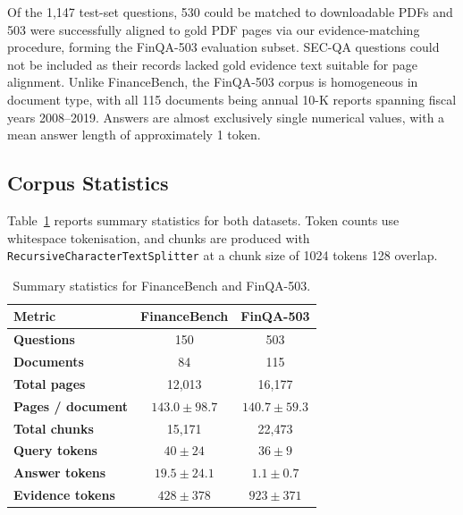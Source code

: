 \documentclass[12pt,twoside,maitrise]{dms}
\theoremstyle{definition}
\numberwithin{equation}{section}
\numberwithin{table}{chapter}
\numberwithin{figure}{chapter}
\begin{document}
Of the 1,147 test-set questions, 530 could be matched to downloadable PDFs and 503
were successfully aligned to gold PDF pages via our evidence-matching procedure,
forming the FinQA-503 evaluation subset. SEC-QA questions could not be
included as their records lacked gold evidence text suitable for page alignment.
Unlike FinanceBench, the FinQA-503 corpus is homogeneous in document type, with all
115 documents being annual 10-K reports spanning fiscal years 2008--2019. Answers are
almost exclusively single numerical values, with a mean answer length of approximately
1 token.

\subsection{Corpus Statistics}
\label{sec:corpus_stats}

Table~\ref{tab:dataset_stats} reports summary statistics for both datasets.
Token counts use whitespace tokenisation, and chunks are produced with
\texttt{RecursiveCharacterTextSplitter} at a chunk size of 1024 tokens 128 overlap.

\begin{table}[ht]
\centering
\small
\caption{Summary statistics for FinanceBench and FinQA-503.}
\label{tab:dataset_stats}
\begin{tabular}{lcc}
\toprule
\textbf{Metric} & \textbf{FinanceBench} & \textbf{FinQA-503} \\
\midrule
\textbf{Questions} & 150 & 503 \\
\textbf{Documents} & 84 & 115 \\
\textbf{Total pages} & 12,013 & 16,177 \\
\textbf{Pages / document} & $143.0 \pm 98.7$ & $140.7 \pm 59.3$ \\
\textbf{Total chunks} & 15,171 & 22,473 \\
\midrule
\textbf{Query tokens} & $40 \pm 24$ & $36 \pm 9$ \\
\textbf{Answer tokens} & $19.5 \pm 24.1$ & $1.1 \pm 0.7$ \\
\midrule
\textbf{Evidence tokens} & $428 \pm 378$ & $923 \pm 371$ \\
\bottomrule
\end{tabular}
\end{table}
\end{document}
